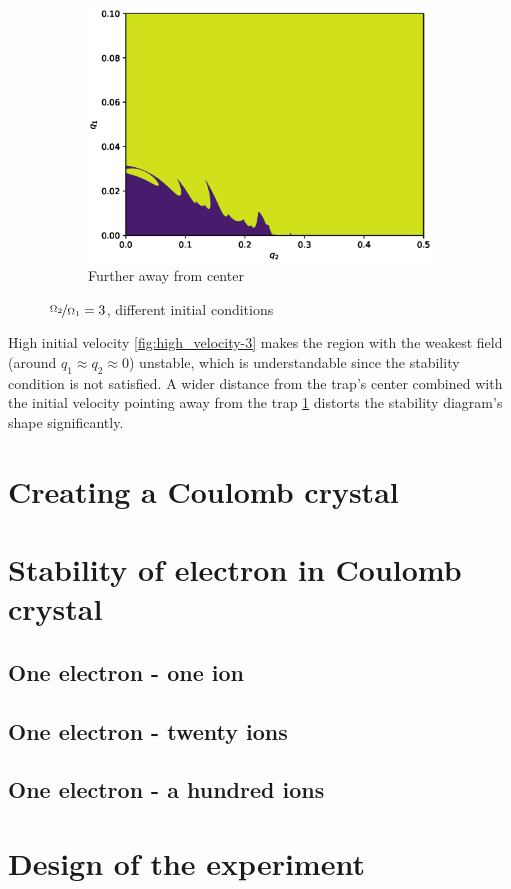\begin{figure}[H]
\begin{subfigure}{.3\textwidth}
  \includegraphics[width=\linewidth]{img/large_radius.eps}  
  \caption{Further away from center}
  \label{fig:large_radius-3}
\end{subfigure}
\caption{$\nicefrac{\Omega_2}{\Omega_1} = 3$, different initial conditions}
\label{fig:init-conds-eta=3}
\end{figure}

High initial velocity \ref{fig:high_velocity-3} makes the region with the weakest field (around $q_1 \approx q_2 \approx 0$) unstable, which is understandable since the stability condition  is not satisfied. A wider distance from the trap's center combined with the initial velocity pointing away from the trap \ref{fig:large_radius-3} distorts the stability diagram's shape significantly.  

\section{Creating a Coulomb crystal}

\section{Stability of electron in Coulomb crystal}
\subsection{One electron - one ion}
\subsection{One electron - twenty ions}
\subsection{One electron - a hundred ions}

\section{Design of the experiment}
